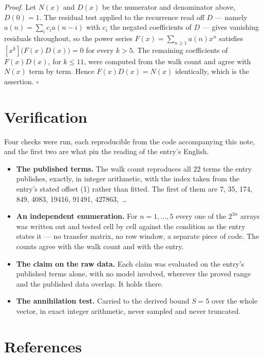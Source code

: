 \documentclass[11pt]{article}
\theoremstyle{definition}
\begin{document}
{\itshape Proof.} Let $N(x)$ and $D(x)$ be the numerator and denominator above, $D(0)=1$. The residual test applied to the recurrence read off $D$ --- namely $a(n) = \sum_i c_i a(n-i)$ with $c_i$ the negated coefficients of $D$ --- gives vanishing residuals throughout, so the power series $F(x)=\sum_{n\ge 1}a(n)x^n$ satisfies $[x^k]\bigl(F(x)D(x)\bigr) = 0$ for every $k > 5$. The remaining coefficients of $F(x)D(x)$, for $k \le 11$, were computed from the walk count and agree with $N(x)$ term by term. Hence $F(x)D(x) = N(x)$ identically, which is the assertion. $\square$

\section{Verification}

Four checks were run, each reproducible from the code accompanying this note, and the first two are what pin the reading of the entry's English.

\begin{itemize}

\item {\bfseries The published terms.} The walk count reproduces all 22 terms the entry publishes, exactly, in integer arithmetic, with the index taken from the entry's stated offset (1) rather than fitted. The first of them are 7, 35, 174, 849, 4083, 19416, 91491, 427863,~\dots

\item {\bfseries An independent enumeration.} For $n = 1,\dots,5$ every one of the $2^{3n}$ arrays was written out and tested cell by cell against the condition as the entry states it --- no transfer matrix, no row window, a separate piece of code. The counts agree with the walk count and with the entry.

\item {\bfseries The claim on the raw data.} Each claim was evaluated on the entry's published terms alone, with no model involved, wherever the proved range and the published data overlap. It holds there.

\item {\bfseries The annihilation test.} Carried to the derived bound $S = 5$ over the whole vector, in exact integer arithmetic, never sampled and never truncated.

\end{itemize}

\section{References}
\end{document}
